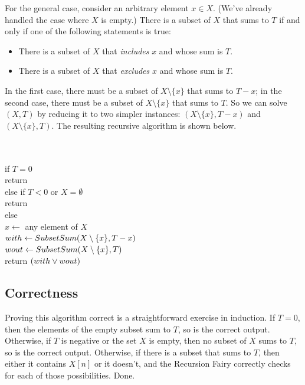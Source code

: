 For the general case, consider an arbitrary element $x \in X$.
(We’ve already handled the case where $X$ is empty.)
There is a subset of $X$ that sums to $T$ if and only if one of the following statements is true:
\begin{itemize}
\item There is a subset of $X$ that \textit{includes} $x$ and whose sum is $T$.
\item There is a subset of $X$ that \textit{excludes} $x$ and whose sum is $T$.
\end{itemize}
In the first case, there must be a subset of $X \setminus \{x\}$ that sums to $T - x$; in the second case, there must be a subset of $X \setminus \{x\}$ that sums to $T$.
So we can solve $(X, T)$ by reducing it to two simpler instances: $(X \setminus \{x\}, T - x)$ and $(X \setminus \{x\}, T)$.
The resulting recursive algorithm is shown below.

\begin{pseudocode}
\\
\\
if $T = 0$\\
\Indent return \\
else if $T < 0$ or $X = \emptyset$\\
\Indent return \\
else\\
\Indent $x \gets$ any element of $X$\\
\Indent $with \gets SubsetSum(X \setminus \{x\}, T - x)$ \\
\Indent $wout \gets SubsetSum(X \setminus \{x\}, T)$ \\
\Indent return $(with \vee wout)$
\end{pseudocode}

\subsection{Correctness}

Proving this algorithm correct is a straightforward exercise in induction.
If $T = 0$, then the elements of the empty subset sum to $T$, so  is the correct output.
Otherwise, if $T$ is negative or the set $X$ is empty, then no subset of $X$ sums to $T$, so  is the correct output.
Otherwise, if there is a subset that sums to $T$, then either it contains $X[n]$ or it doesn’t, and the Recursion Fairy correctly checks for each of those possibilities.
Done.

